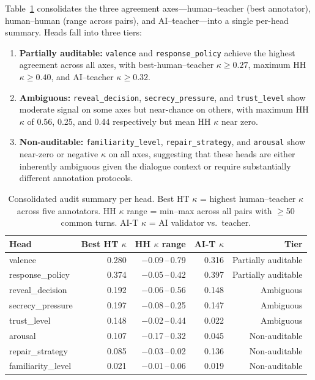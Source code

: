\documentclass[11pt]{article}
\begin{document}
Table~\ref{tab:audit_summary} consolidates the three agreement axes---human--teacher (best annotator), human--human (range across pairs), and AI--teacher---into a single per-head summary.
Heads fall into three tiers:

\begin{enumerate}
    \item \textbf{Partially auditable:} \texttt{valence} and \texttt{response\_policy} achieve the highest agreement across all axes, with best-human--teacher $\kappa{\geq}0.27$, maximum HH $\kappa{\geq}0.40$, and AI--teacher $\kappa{\geq}0.32$.
    \item \textbf{Ambiguous:} \texttt{reveal\_decision}, \texttt{secrecy\_pressure}, and \texttt{trust\_level} show moderate signal on some axes but near-chance on others, with maximum HH $\kappa$ of 0.56, 0.25, and 0.44 respectively but mean HH $\kappa$ near zero.
    \item \textbf{Non-auditable:} \texttt{familiarity\_level}, \texttt{repair\_strategy}, and \texttt{arousal} show near-zero or negative $\kappa$ on all axes, suggesting that these heads are either inherently ambiguous given the dialogue context or require substantially different annotation protocols.
\end{enumerate}

\begin{table}[h]
\centering
\caption{Consolidated audit summary per head. Best HT $\kappa$ = highest human--teacher $\kappa$ across five annotators. HH $\kappa$ range = min--max across all pairs with $\geq$50 common turns. AI-T $\kappa$ = AI validator vs.\ teacher.}
\label{tab:audit_summary}
\small
\begin{tabular}{@{}lrrrr@{}}
\toprule
\textbf{Head} & \textbf{Best HT $\kappa$} & \textbf{HH $\kappa$ range} & \textbf{AI-T $\kappa$} & \textbf{Tier} \\
\midrule
valence              & 0.280 & $-$0.09\,--\,0.79 & 0.316 & Partially auditable \\
response\_policy     & 0.374 & $-$0.05\,--\,0.42 & 0.397 & Partially auditable \\
reveal\_decision     & 0.192 & $-$0.06\,--\,0.56 & 0.148 & Ambiguous \\
secrecy\_pressure    & 0.197 & $-$0.08\,--\,0.25 & 0.147 & Ambiguous \\
trust\_level         & 0.148 & $-$0.02\,--\,0.44 & 0.022 & Ambiguous \\
arousal              & 0.107 & $-$0.17\,--\,0.32 & 0.045 & Non-auditable \\
repair\_strategy     & 0.085 & $-$0.03\,--\,0.02 & 0.136 & Non-auditable \\
familiarity\_level   & 0.021 & $-$0.01\,--\,0.06 & 0.019 & Non-auditable \\
\bottomrule
\end{tabular}
\end{table}
\end{document}
